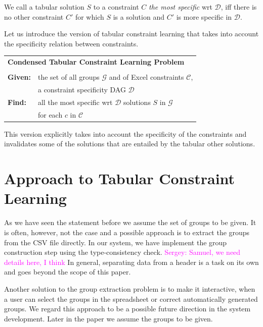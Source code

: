 \documentclass{ecai}
\newcommand{\sergey}[1]{\textcolor{magenta}{{\sc Sergey:} #1}\xspace}
\newcommand{\constraints}{\ensuremath{\mathcal{C}}\xspace}
\newcommand{\dependencies}{\ensuremath{\mathcal{D}}\xspace}
\newcommand{\groups}{\ensuremath{\mathcal{G}}\xspace}
\begin{document}
We call a tabular solution $S$ to a constraint $C$ \textit{the most specific} wrt \dependencies, iff there is no other constraint $C'$ for which $S$ is a solution and $C'$ is more specific in \dependencies.


Let us introduce the version of tabular constraint learning that takes into account the specificity relation between constraints.

\begin{minipage}[c]{14em}
  \vspace{5pt}
  \begin{tabular}{ll}
    \multicolumn{2}{l}{{\textbf{Condensed Tabular Constraint Learning Problem}}}\\
    \vspace{-4pt}
    &\\
    \textbf{Given:}& the set of all groups $\groups$ and of Excel constraints $\constraints$,\\ 
    & a constraint specificity DAG \dependencies \\
    \textbf{Find:}& all the most specific wrt \dependencies solutions $S$ in \groups\\ 
    & for each $c$ in \constraints \\
  \end{tabular}
  \vspace{6pt}
\end{minipage}

This version explicitly takes into account the specificity of the constraints and invalidates some of the solutions that are entailed by the tabular other solutions.

\section{Approach to Tabular Constraint Learning}
As we have seen the statement before we assume the set of groups to be given. It is often, however, not the case and a possible approach is to extract the groups from the CSV file directly. In our system, we have implement the group construction step using the type-consistency check. \sergey{Samuel, we need details here, I think} In general, separating data from a header is a task on its own  \cite{header} and goes beyond the scope of this paper. 

Another solution to the group extraction problem is to make it interactive, when a user can select the groups in the spreadsheet or correct automatically generated groups. We regard this approach to be a possible future direction in the system development. Later in the paper we assume the groups to be given.
\end{document}
